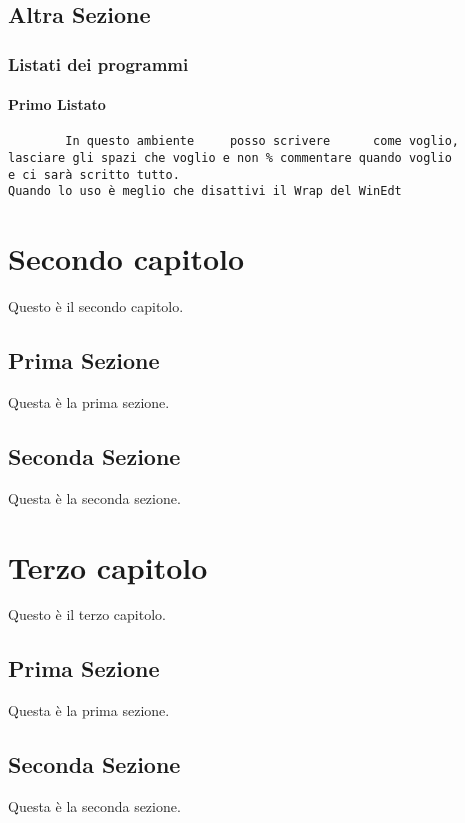 \documentclass[12pt,a4paper,openright,twoside]{report}
\begin{document}
\section{Altra Sezione}\label{sec:prova}

\subsection{Listati dei programmi}
\subsubsection{Primo Listato}
\begin{verbatim}
        In questo ambiente     posso scrivere      come voglio,
lasciare gli spazi che voglio e non % commentare quando voglio
e ci sarà scritto tutto.
Quando lo uso è meglio che disattivi il Wrap del WinEdt
\end{verbatim}

\clearpage{\pagestyle{empty}\cleardoublepage}
\chapter{Secondo capitolo}

Questo \`e il secondo capitolo.
\section{Prima Sezione}
Questa \`e la prima sezione.

\section{Seconda Sezione}
Questa \`e la seconda sezione.

\clearpage{\pagestyle{empty}\cleardoublepage}
\chapter{Terzo capitolo}

Questo \`e il terzo capitolo.

\section{Prima Sezione}
Questa \`e la prima sezione.

\section{Seconda Sezione}
Questa \`e la seconda sezione.
\end{document}
